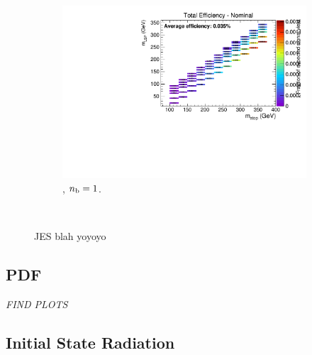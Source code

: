 \begin{figure}[ht!]
\begin{subfigure}[b]{0.32\textwidth}
    \includegraphics[width=\textwidth, page=6]{Figs/sms/t2cc/v24/JES_T2cc_v24_eq1b_ge4j_incl.pdf}
    \caption{\njhigh, $n_{\text{b}} = 1$.}
  \end{subfigure}\\
  \caption{JES blah yoyoyo}
  \label{fig:sms-jes-t2cc}
\end{figure}


\newpage
\subsection*{PDF}
\label{sec:t2cc_pdf_plots}
\emph{FIND PLOTS}



\newpage
\subsection*{Initial State Radiation}
\label{sec:t2cc_isr_plots}

